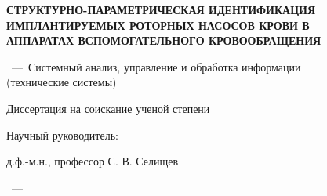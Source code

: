 \vspace{0pt plus6fill} %
\begin{center}%
{\thesisAuthor}
\end{center}%
%
\vspace{0pt plus1fill} %
\begin{center}%
\textbf{СТРУКТУРНО-ПАРАМЕТРИЧЕСКАЯ ИДЕНТИФИКАЦИЯ ИМПЛАНТИРУЕМЫХ РОТОРНЫХ НАСОСОВ КРОВИ В \\ АППАРАТАХ ВСПОМОГАТЕЛЬНОГО КРОВООБРАЩЕНИЯ}

\vspace{0pt plus2fill} %
\vspace{\baselineskip}
{%
\thesisSpecialtyNumber~---~Системный анализ, управление и обработка информации \\(технические системы) %
}

\vspace{0pt plus2fill} %
Диссертация на соискание ученой степени

\thesisDegree
\end{center}%
%
\vspace{0pt plus4fill} %
\begin{flushright}%
Научный руководитель:

д.ф.-м.н., профессор С. В. Селищев %

\end{flushright}%
%
\vspace{0pt plus4fill} %
\begin{center}%
{\thesisCity~--- \thesisYear}
\end{center}%
\newpage
